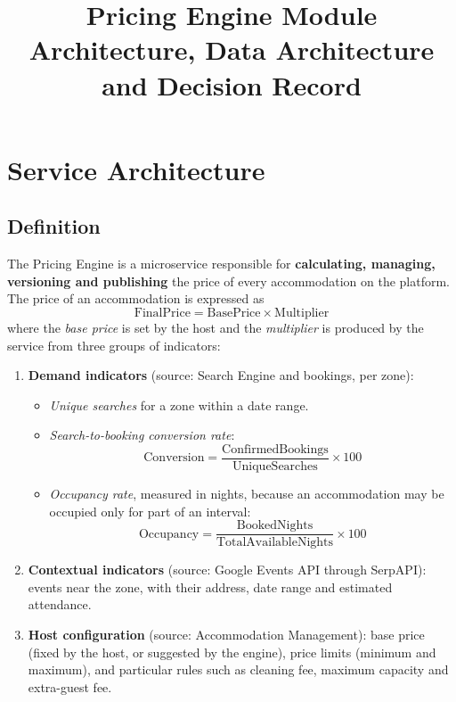 \documentclass[11pt,a4paper]{article}
\title{\textbf{Pricing Engine Module}\\[4pt]\large Architecture, Data Architecture and Decision Record}
\author{}
\date{}
\begin{document}
\maketitle
\tableofcontents
\newpage

\section{Service Architecture}

\subsection{Definition}
The Pricing Engine is a microservice responsible for \textbf{calculating,
managing, versioning and publishing} the price of every accommodation on the
platform. The price of an accommodation is expressed as
\[
  \text{FinalPrice} = \text{BasePrice} \times \text{Multiplier}
\]
where the \emph{base price} is set by the host and the \emph{multiplier} is
produced by the service from three groups of indicators:

\begin{enumerate}[label=\textbf{\arabic*.}]
  \item \textbf{Demand indicators} (source: Search Engine and bookings, per zone):
  \begin{itemize}
    \item \emph{Unique searches} for a zone within a date range.
    \item \emph{Search-to-booking conversion rate}:
      \[
        \text{Conversion} = \frac{\text{ConfirmedBookings}}{\text{UniqueSearches}} \times 100
      \]
    \item \emph{Occupancy rate}, measured in nights, because an accommodation
      may be occupied only for part of an interval:
      \[
        \text{Occupancy} = \frac{\text{BookedNights}}{\text{TotalAvailableNights}} \times 100
      \]
  \end{itemize}
  \item \textbf{Contextual indicators} (source: Google Events API through SerpAPI):
  events near the zone, with their address, date range and estimated attendance.
  \item \textbf{Host configuration} (source: Accommodation Management):
  base price (fixed by the host, or suggested by the engine), price limits
  (minimum and maximum), and particular rules such as cleaning fee, maximum
  capacity and extra-guest fee.
\end{enumerate}
\end{document}
